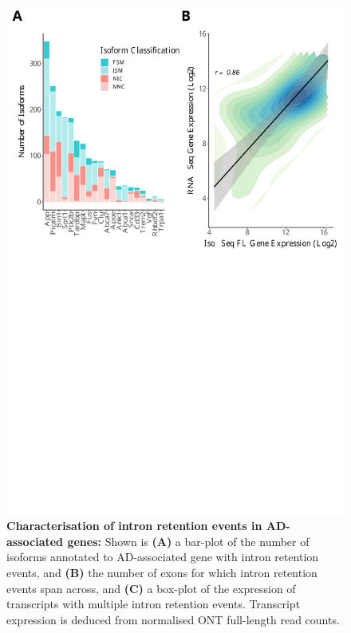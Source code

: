 \begin{figure}[]
	\centering
	\includegraphics[page=11,trim={0 0cm 0 0cm},clip,scale = 0.55]{Figures/ONTvsIsoSeq.pdf}
	\captionsetup{width=0.95\textwidth}
	\caption[Characterisation of intron retention events in AD-associated genes]%
	{\textbf{Characterisation of intron retention events in AD-associated genes:} Shown is \textbf{(A)} a bar-plot of the number of isoforms annotated to AD-associated gene with intron retention events, and \textbf{(B)} the number of exons for which intron retention events span across, and \textbf{(C)} a box-plot of the expression of transcripts with multiple intron retention events. Transcript expression is deduced from normalised ONT full-length read counts.}
	\label{fig:IR_targeted}
\end{figure}
\restoregeometry

